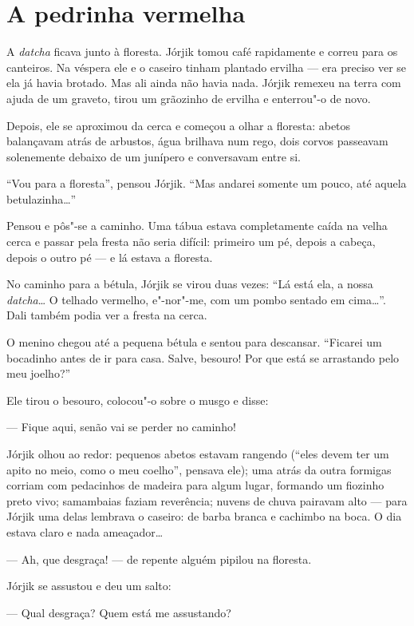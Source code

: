 \chapter{A pedrinha vermelha} \label{part14}

A \emph{datcha} ficava junto à floresta. Jórjik tomou café rapidamente e
correu para os canteiros. Na véspera ele e o caseiro tinham plantado
ervilha --- era preciso ver se ela já havia brotado. Mas ali ainda não
havia nada. Jórjik remexeu na terra com ajuda de um graveto, tirou um
grãozinho de ervilha e enterrou"-o de novo.

Depois, ele se aproximou da cerca e começou a olhar a floresta: abetos
balançavam atrás de arbustos, água brilhava num rego, dois corvos
passeavam solenemente debaixo de um junípero e conversavam entre si.

``Vou para a floresta'', pensou Jórjik. ``Mas andarei somente um pouco,
até aquela betulazinha\ldots{}''

Pensou e pôs"-se a caminho. Uma tábua estava completamente caída na velha
cerca e passar pela fresta não seria difícil: primeiro um pé, depois a
cabeça, depois o outro pé --- e lá estava a floresta.

No caminho para a bétula, Jórjik se virou duas vezes: ``Lá está ela, a
nossa \emph{datcha}\ldots{} O telhado vermelho, e"-nor"-me, com um pombo
sentado em cima\ldots{}''. Dali também podia ver a fresta na cerca.

O menino chegou até a pequena bétula e sentou para descansar. ``Ficarei
um bocadinho antes de ir para casa. Salve, besouro! Por que está se
arrastando pelo meu joelho?''

Ele tirou o besouro, colocou"-o sobre o musgo e disse:

--- Fique aqui, senão vai se perder no caminho!

Jórjik olhou ao redor: pequenos abetos estavam rangendo (``eles devem
ter um apito no meio, como o meu coelho'', pensava ele); uma atrás da
outra formigas corriam com pedacinhos de madeira para algum lugar, formando um fiozinho preto vivo; samambaias faziam reverência; nuvens
de chuva pairavam alto --- para Jórjik uma delas lembrava o caseiro: de
barba branca e cachimbo na boca. O dia estava claro e nada ameaçador\ldots{}

--- Ah, que desgraça! --- de repente alguém pipilou na floresta.

Jórjik se assustou e deu um salto:

--- Qual desgraça? Quem está me assustando?

